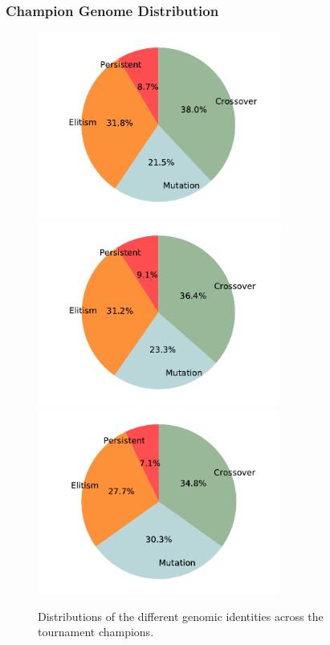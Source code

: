 \documentclass{beamer}
\begin{document}
  \begin{frame}

    \frametitle{Champion Genome Distribution} 
    \begin{figure}[!ht]
      \centering
      \includegraphics[width=80mm]{images/results/1ply/champ_gen_dist.pdf}
      \includegraphics[width=80mm]{images/results/3ply/champ_gen_dist.pdf}
      \includegraphics[width=80mm]{images/results/6ply/champ_gen_dist.pdf}
      \caption{Distributions of the different genomic identities across the tournament champions. \label{champ_gen_dist}}
  \end{figure}

  \end{frame}
\end{document}

